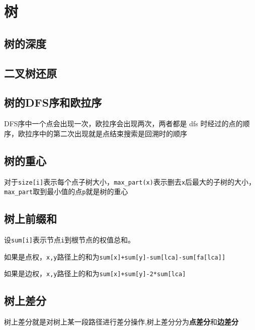 \section{树}
\subsection{树的深度}


\subsection{二叉树还原}


\subsection{树的DFS序和欧拉序}
DFS序中一个点会出现一次，欧拉序会出现两次，两者都是 dfs 时经过的点的顺序，欧拉序中的第二次出现就是点结束搜索是回溯时的顺序


\subsection{树的重心}
对于\verb|size[i]|表示每个点子树大小，\verb|max_part(x)|表示删去\verb|x|后最大的子树的大小，\verb|max_part|取到最小值的点\verb|p|就是树的重心


\subsection{树上前缀和}
设\verb|sum[i]|表示节点\verb|i|到根节点的权值总和。

如果是点权，\verb|x,y|路径上的和为\verb|sum[x]+sum[y]-sum[lca]-sum[fa[lca]]|


如果是边权，\verb|x,y|路径上的和为\verb|sum[x]+sum[y]-2*sum[lca]|

\subsection{树上差分}
树上差分就是对树上某一段路径进行差分操作,树上差分分为\textbf{点差分}和\textbf{边差分}


